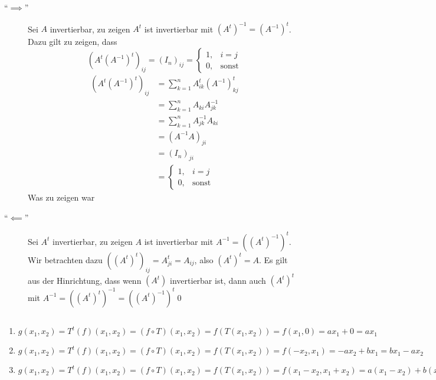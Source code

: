 \documentclass[sectionformat = aufgabe]{gadsescript}
\begin{document}
\maketitle
\setcounter{section}{2}
\subsection{}
\begin{proof*}
	\begin{description}
		\item[``$ \implies  $''] Sei $ A $ invertierbar, zu zeigen $ A^t $ ist invertierbar mit $ (A^t)^{-1} = \left( A^{-1}  \right) ^t $. Dazu gilt zu zeigen, dass 
			\[
				\left( A^t \left( A^{-1}  \right) ^t \right)_{ij} = (I_n)_{ij} 
				= \begin{cases}
					1, & i = j\\
					0, & \text{sonst} 
				\end{cases}
			\]
			\begin{align*}
				\left( A^t \left( A^{-1}  \right) ^t \right)_{ij} %
				&= \sum_{k=1}^{n} A^t_{ik} \left( A^{-1}  \right) ^t_{kj}  \\
				&= \sum_{k=1}^{n} A_{ki} A^{-1} _{jk}  \\
				&= \sum_{k=1}^{n} A^{-1}_{jk} A_{ki} \\
				&= \left( A^{-1} A \right) _{ji}  \\
				&= (I_n)_{ji} \\
				&= \begin{cases}
					1, & i = j\\
					0, & \text{sonst} 
				\end{cases}
			\end{align*}
			Was zu zeigen war
		\item[``$ \impliedby  $''] Sei $ A^t $ invertierbar, zu zeigen $ A $ ist invertierbar mit $ A^{-1} = \left( \left( A^t \right) ^{-1}  \right) ^{t}  $.
			Wir betrachten dazu $ (\left( A^t \right) ^t)_{ij}  = A^{t} _{ji} = A_{ij}  $, also $ \left( A^t \right) ^t = A $.
			Es gilt aus der Hinrichtung, dass wenn $ (A^t) $ invertierbar ist, dann auch $ (A^t)^t $ mit $ A^{-1} = \left( \left( A^t \right) ^t \right) ^{-1} = \left( \left( A^t \right) ^{-1}  \right) ^t $\qed
	\end{description}
\end{proof*}

\subsection{}
\begin{enumerate}[label=(\alph*)]
	\item $ g(x_1, x_2) = T^t(f)(x_1, x_2) = (f \circ T)(x_1, x_2) = f(T(x_1, x_2)) = f(x_1, 0) = ax_1 + 0 = ax_1 $
	\item $ g(x_1, x_2) = T^t(f)(x_1, x_2) = (f \circ T)(x_1, x_2) = f(T(x_1, x_2)) = f(-x_2, x_1) = - ax_2 + bx_1 = bx_1 - ax_2 $
	\item $ g(x_1, x_2) = T^t(f)(x_1, x_2) = (f \circ T)(x_1, x_2) = f(T(x_1, x_2)) = f(x_1-x_2, x_1 + x_2) = a(x_1 - x_2) + b(x_1 + x_2) = (a + b)x_1 - (a - b) x_2 $
\end{enumerate}
\end{document}
